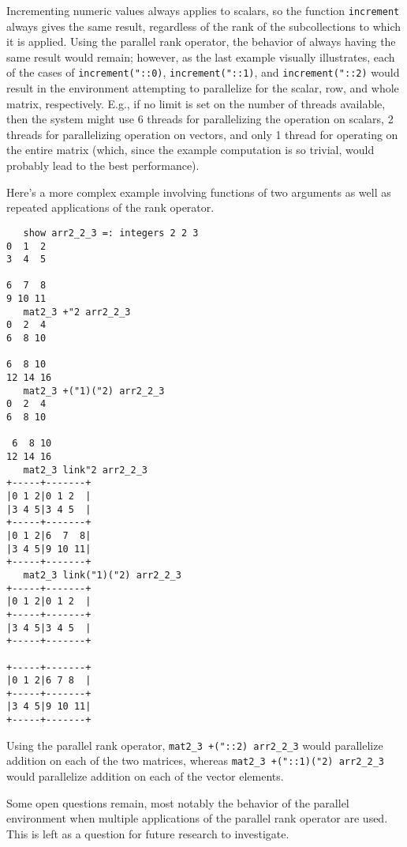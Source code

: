 Incrementing numeric values always applies to scalars, so the function \texttt{increment} always gives the same result, 
regardless of the rank of the subcollections to which it is applied. 
Using the parallel rank operator, the behavior of always having the same result would remain; 
however, as the last example visually illustrates, 
each of the cases of \texttt{increment("::0)}, \texttt{increment("::1)}, and \texttt{increment("::2)}
would result in the environment attempting to parallelize for the scalar, row, and whole matrix, respectively.
E.g., if no limit is set on the number of threads available, 
then the system might use 6 threads for parallelizing the operation on scalars, 
2 threads for parallelizing operation on vectors, 
and only 1 thread for operating on the entire matrix 
(which, since the example computation is so trivial, would probably lead to the best performance).

Here's a more complex example involving functions of two arguments 
as well as repeated applications of the rank operator.

\begin{singlespacing}
\begin{small}
\begin{verbatim}
   show arr2_2_3 =: integers 2 2 3
0  1  2
3  4  5

6  7  8
9 10 11
   mat2_3 +"2 arr2_2_3
0  2  4
6  8 10

6  8 10
12 14 16
   mat2_3 +("1)("2) arr2_2_3
0  2  4
6  8 10

 6  8 10
12 14 16
   mat2_3 link"2 arr2_2_3
+-----+-------+
|0 1 2|0 1 2  |
|3 4 5|3 4 5  |
+-----+-------+
|0 1 2|6  7  8|
|3 4 5|9 10 11|
+-----+-------+
   mat2_3 link("1)("2) arr2_2_3
+-----+-------+
|0 1 2|0 1 2  |
+-----+-------+
|3 4 5|3 4 5  |
+-----+-------+

+-----+-------+
|0 1 2|6 7 8  |
+-----+-------+
|3 4 5|9 10 11|
+-----+-------+
\end{verbatim}
\end{small}
\end{singlespacing}


Using the parallel rank operator, 
\texttt{mat2\_3 +("::2) arr2\_2\_3} would parallelize addition on each of the two matrices, whereas
\texttt{mat2\_3 +("::1)("2) arr2\_2\_3} would parallelize addition on each of the vector elements.

Some open questions remain, most notably 
the behavior of the parallel environment when multiple applications of the parallel rank operator are used. 
This is left as a question for future research to investigate.


